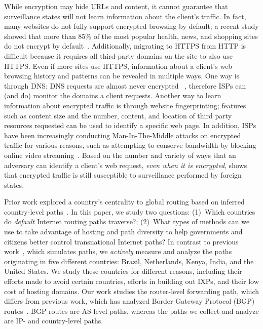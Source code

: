 While encryption may hide URLs and content, it cannot guarantee that surveillance 
states will not learn information about the client's traffic.  In fact, many websites do not fully support 
encrypted browsing by default; a recent study showed that more than 85\% of the most popular 
health, news, and shopping sites do not encrypt by default~\cite{what_isps_can_see}.  Additionally, migrating 
to HTTPS from HTTP is difficult because it requires all third-party domains on the site to also use 
HTTPS.  Even if more sites use HTTPS, information about a client's web browsing history and patterns 
can be revealed in multiple ways. One way is through DNS: DNS requests are almost never encrypted ~\cite{what_isps_can_see}, therefore 
ISPs can (and do) monitor the domains a client requests. Another way to learn information about encrypted traffic is through website fingerprinting; features 
such as content size and the number, content, and location of third party resources requested can be used to 
identify a specific web page.  In addition, ISPs have been increasingly conducting Man-In-The-Middle attacks on 
encrypted traffic for various reasons, such as attempting to conserve bandwidth by blocking online video streaming~\cite{mitm_isp}.  
Based on the number and variety of ways that an adversary can identify a client's web request, \textit{even when it is encrypted}, 
shows that encrypted traffic is still susceptible to surveillance performed by foreign states.

Prior work explored a country's centrality to global routing based on 
inferred country-level paths~\cite{karlin2009nation}. 
In this paper, we study two questions: (1)~Which countries do {\em
  default} Internet routing paths traverse?; (2)~What types of methods
can we use to take advantage of hosting and path diversity to help governments
and citizens better control transnational Internet paths? 
In contrast to previous work~\cite{karlin2009nation}, which simulates paths, we \textit{actively} measure and analyze the paths originating in
five different countries: Brazil, Netherlands, Kenya, India, and the
United States.  We study these countries for different reasons, including their efforts made to avoid certain countries, efforts in building out IXPs, and their low cost of hosting domains.  Our work studies the router-level forwarding path, which differs from 
 previous work, which has analyzed Border Gateway Protocol (BGP) routes~\cite{karlin2009nation,shah2015characterizing}.  
BGP routes are AS-level paths, whereas the paths we collect and analyze are IP- and country-level paths.  

